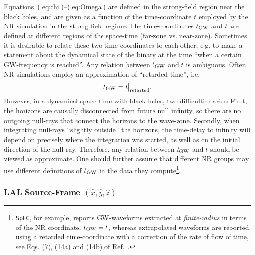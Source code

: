 \documentclass[11pt,tightenlines,article,amssymb,amsmath,amsfonts,superscriptaddress,nofootinbib]{revtex4}
\newcommand{\harald}[1]{\textcolor{Cerulean}{#1}}
\newcommand{\tGW}{t_{\rm GW}}
\newcommand{\ExS}{{{\hat x}}}
\newcommand{\EyS}{{{\hat y}}}
\newcommand{\EzS}{{{\hat z}}}
\begin{document}
\harald{Equations~(\ref{eq:chi})--(\ref{eq:Omega}) are defined in the
strong-field region near the black holes, and are given as a function
of the time-coordinate $t$ employed by the NR simulation in the strong
field regime.
The time-coordinates $\tGW$ and $t$ are defined at different regions
of the space-time (far-zone vs. near-zone).  Sometimes it is desirable
to relate these two time-coordinates to each other, e.g. to make a
statement about the dynamical state of the binary at the time ``when a
certain GW-frequency is reached''.  Any relation between $\tGW$ and
$t$ is ambiguous.  Often NR simulations employ an approximation of
``retarded time'', i.e.}
\begin{equation}
  \label{eq:tretarted}
  \tGW = t\big|_{\rm retarted}.
\end{equation}
However, in a dynamical space-time with black holes, two difficulties
arise: First, the horizons are causally disconnected from future null
infinity, so there are no outgoing null-rays that connect the horizons
to the wave-zone.  Secondly, when integrating null-rays ``slightly
outside'' the horizons, the time-delay to infinity will depend on
precisely where the integration was started, as well as on the initial
direction of the null-ray.  Therefore, any relation between $\tGW$ and
$t$ should be viewed as approximate. One should further assume that
different NR groups may use different definitions of $\tGW$ in the
data they compute\footnote{{\tt SpEC}, for example, reports GW-waveforms
extracted at \emph{finite-radius} in terms of the NR coordinate,
$\tGW=t$, whereas extrapolated waveforms are reported using a retarded
time-coordinate with a correction of the rate of flow of time, see
Eqs. (7), (14a) and (14b) of Ref.~\cite{Boyle:2009vi}.}.


\subsubsection{LAL Source-Frame \boldmath$(\ExS, \EyS, \EzS)$}
\end{document}
